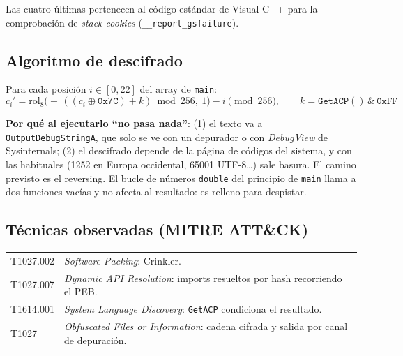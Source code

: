 \documentclass[11pt,a4paper]{article}
\begin{document}
Las cuatro últimas pertenecen al código estándar de Visual C++ para la comprobación de \emph{stack cookies}
(\texttt{\_\_report\_gsfailure}).

\subsection{Algoritmo de descifrado}
Para cada posición $i \in [0,22]$ del array de \texttt{main}:
\[ c_i' = \mathrm{rol}_8\!\big(-\,((c_i \oplus \mathtt{0x7C}) + k) \bmod 256,\ 1\big) - i \pmod{256},
   \qquad k = \mathtt{GetACP()} \,\&\, \mathtt{0xFF} \]

\textbf{Por qué al ejecutarlo ``no pasa nada''}: (1) el texto va a \texttt{OutputDebugStringA}, que solo se ve con un
depurador o con \emph{DebugView} de Sysinternals; (2) el descifrado depende de la página de códigos del sistema, y con
las habituales (1252 en Europa occidental, 65001 UTF-8\dots) sale basura. El camino previsto es el reversing.
El bucle de números \texttt{double} del principio de \texttt{main} llama a dos funciones vacías y no afecta al
resultado: es relleno para despistar.

\subsection{Técnicas observadas (MITRE ATT\&CK)}
\begin{tabularx}{\linewidth}{@{}lX@{}}
\toprule
T1027.002 & \emph{Software Packing}: Crinkler. \\
T1027.007 & \emph{Dynamic API Resolution}: imports resueltos por hash recorriendo el PEB. \\
T1614.001 & \emph{System Language Discovery}: \texttt{GetACP} condiciona el resultado. \\
T1027 & \emph{Obfuscated Files or Information}: cadena cifrada y salida por canal de depuración. \\
\bottomrule
\end{tabularx}
\end{document}
